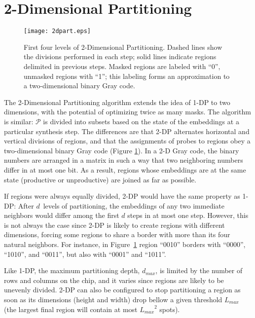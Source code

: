 \section{2-Dimensional Partitioning}
\label{sec:part_2d}

\begin{figure}[t]\centering
\texttt{[image: 2dpart.eps]}
\caption{\label{fig:2dpart}%
  First four levels of 2-Dimensional Partitioning. Dashed lines show the
  divisions performed in each step; solid lines indicate regions delimited in
  previous steps. Masked regions are labeled with ``0'', unmasked regions with
  ``1''; this labeling forms an approximation to a two-dimensional binary Gray
  code.}%
\end{figure}

The 2-Dimensional Partitioning algorithm \citep{Carvalho2007} extends the idea of
1-DP to two dimensions, with the potential of optimizing twice as many masks.
The algorithm is similar: $\mathcal{P}$ is divided into subsets based on the
state of the embeddings at a particular synthesis step. The differences are that
2-DP alternates horizontal and vertical divisions of regions, and that the
assignments of probes to regions obey a two-dimensional binary Gray code (Figure
\ref{fig:2dpart}). In a 2-D Gray code, the binary numbers are arranged in a
matrix in such a way that two neighboring numbers differ in at most one bit. As
a result, regions whose embeddings are at the same state (productive or
unproductive) are joined as far as possible.

If regions were always equally divided, 2-DP would have the same property as 1-
DP: After $d$~levels of partitioning, the
embeddings of any two immediate neighbors would differ among the first $d$ steps
in at most one step. However, this is not always the case since 2-DP is likely
to create regions with different dimensions, forcing some regions to share a
border with more than its four natural neighbors. For instance, in
Figure~\ref{fig:2dpart} region ``0010'' borders with ``0000'', ``1010'', and
``0011'', but also with ``0001'' and ``1011''.

Like 1-DP, the maximum partitioning depth, $d_{max}$, is limited by the number
of rows and columns on the chip, and it varies since regions are likely to be
unevenly divided. 2-DP can also be configured to stop partitioning a region as
soon as its dimensions (height and width) drop bellow a given threshold
$L_{max}$ (the largest final region will contain at most ${L_{max}}^2$ spots).

